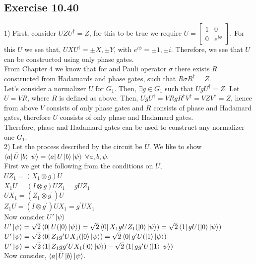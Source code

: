 \documentclass[a4paper,12pt]{article}
\begin{document}
\subsection*{Exercise 10.40}
1) First, consider $UZU^\dagger=Z$, for this to be true
we require $U=\begin{bmatrix}
    1&0\\
    0&e^{i\phi}
\end{bmatrix}$. For this $U$ we see that, 
$UXU^\dagger=\pm X, \pm Y$, with $e^{i\phi}=\pm 1, \pm i$.
Therefore, we see that $U$ can be constructed using only phase gates.\\
From Chapter 4 we know that for and Pauli operator $\sigma$ there exists
$R$ constructed from Hadamards and phase gates, such that
$R\sigma R^\dagger =Z$.\\
Let's consider a normalizer $U$ for $G_1$. Then, $\exists g\in G_1$ such
that $UgU^\dagger=Z$. Let $U=VR$, where $R$ is defined as above.
Then, $UgU^\dagger=VRgR^\dagger V^\dagger=VZV^\dagger=Z$, hence from above
$V$ consists of only phase gates and $R$ consists of phase and Hadamard gates, therefore
$U$ consists of only phase and Hadamard gates.\\
Therefore, phase and Hadamard gates can be used to construct any normalizer one
$G_1$.\\
2) Let the process described by the circuit be $\bar{U}$. We like to show
$\bra{a}\bar{U}\ket{b}\ket{\psi}=\bra{a}U\ket{b}\ket{\psi}$ $\forall a,b,\psi$.\\
First we get the following from the conditions on $U$,\\
$UZ_1=(X_1\otimes g)U$\\
$X_1U=(I\otimes g)UZ_1=gUZ_1$\\
$UX_1=(Z_1\otimes g^\prime)U$\\
$Z_1U=(I\otimes g^\prime)UX_1=g^\prime UX_1$\\
Now consider $U^\prime\ket{\psi}$\\
$U^\prime\ket{\psi}=\sqrt{2}\bra{0}U(\ket{0}\ket{\psi})=
\sqrt{2}\bra{0}X_1gUZ_1(\ket{0}\ket{\psi})=
\sqrt{2}\bra{1}gU(\ket{0}\ket{\psi})$\\
$U^\prime\ket{\psi}=\sqrt{2}\bra{0}Z_1g^\prime UX_1(\ket{0}\ket{\psi})=
\sqrt{2}\bra{0}g^\prime U(\ket{1}\ket{\psi})$\\
$U^\prime\ket{\psi}=\sqrt{2}\bra{1}Z_1g g^\prime UX_1(\ket{0}\ket{\psi})
-\sqrt{2}\bra{1}g g^\prime U(\ket{1}\ket{\psi})$\\
Now consider, $\bra{a}\bar{U}\ket{b}\ket{\psi}$.\\
\end{document}
